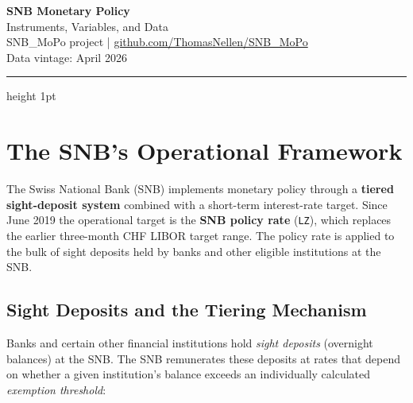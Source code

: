\documentclass[12pt,a4paper]{article}
\begin{document}

\begin{center}
  {\LARGE\bfseries SNB Monetary Policy}\\[0.4em]
  {\large Instruments, Variables, and Data}\\[1.2em]
  {\normalsize SNB\_MoPo project \quad|\quad
   \href{https://github.com/ThomasNellen/SNB_MoPo}{github.com/ThomasNellen/SNB\_MoPo}}\\[0.3em]
  {\small\textcolor{midgray}{Data vintage: April 2026}}
\end{center}

\vspace{0.5em}
\hrule height 1pt
\vspace{1.5em}

\section{The SNB's Operational Framework}

The Swiss National Bank (SNB) implements monetary policy through a
\textbf{tiered sight-deposit system} combined with a short-term interest-rate
target.  Since June 2019 the operational target is the \textbf{SNB policy rate}
(\texttt{LZ}), which replaces the earlier three-month CHF LIBOR target range.
The policy rate is applied to the bulk of sight deposits held by banks and other
eligible institutions at the SNB.

\subsection{Sight Deposits and the Tiering Mechanism}

Banks and certain other financial institutions hold \emph{sight deposits}
(overnight balances) at the SNB.  The SNB remunerates these deposits at
rates that depend on whether a given institution's balance exceeds an
individually calculated \emph{exemption threshold}:
\end{document}

